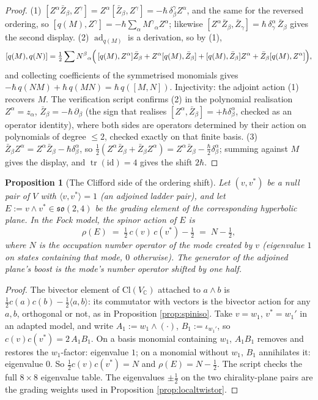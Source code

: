 \documentclass[11pt]{article}
\newtheorem{proposition}[theorem]{Proposition}
\theoremstyle{definition}
\newcommand{\Cl}{\mathrm{Cl}}
\newcommand{\C}{\mathbb{C}}
\newcommand{\ip}[2]{\langle #1, #2\rangle}
\begin{document}
\begin{proof}
(1) $[Z^\alpha\bar Z_\beta, Z^\gamma] = Z^\alpha[\bar Z_\beta, Z^\gamma] = -\hbar\,\delta^\gamma_\beta Z^\alpha$, and the same for the reversed ordering, so $[q(M), Z^\gamma] = -\hbar\sum_\alpha M^\gamma{}_\alpha Z^\alpha$; likewise $[Z^\alpha \bar Z_\beta, \bar Z_\gamma] = \hbar\,\delta^\alpha_\gamma\,\bar Z_\beta$ gives the second display.
(2) $\operatorname{ad}_{q(M)}$ is a derivation, so by (1),
\[
[q(M), q(N)] = \tfrac12\sum N^\beta{}_\alpha\Bigl(\,[q(M),Z^\alpha]\bar Z_\beta + Z^\alpha[q(M),\bar Z_\beta] + [q(M),\bar Z_\beta]Z^\alpha + \bar Z_\beta[q(M),Z^\alpha]\Bigr),
\]
and collecting coefficients of the symmetrised monomials gives $-\hbar\,q(NM) + \hbar\,q(MN) = \hbar\,q([M,N])$. Injectivity: the adjoint action (1) recovers $M$. The verification script confirms (2) in the polynomial realisation $Z^\alpha = z_\alpha$, $\bar Z_\beta = -\hbar\,\partial_\beta$ (the sign that realises $[Z^\alpha, \bar Z_\beta] = +\hbar\delta^\alpha_\beta$, checked as an operator identity), where both sides are operators determined by their action on polynomials of degree $\le 2$, checked exactly on that finite basis.
(3) $\bar Z_\beta Z^\alpha = Z^\alpha \bar Z_\beta - \hbar\delta^\alpha_\beta$, so $\tfrac12(Z^\alpha\bar Z_\beta + \bar Z_\beta Z^\alpha) = Z^\alpha\bar Z_\beta - \tfrac{\hbar}{2}\delta^\alpha_\beta$; summing against $M$ gives the display, and $\operatorname{tr}(\mathrm{id}) = 4$ gives the shift $2\hbar$.
\end{proof}

\begin{proposition}[The Clifford side of the ordering shift]\label{prop:rent}
Let $(v, v^*)$ be a null pair of $V$ with $\ip{v}{v^*} = 1$ (an adjoined ladder pair), and let $E := v\wedge v^* \in \mathfrak{so}(2,4)$ be the grading element of the corresponding hyperbolic plane. In the Fock model, the spinor action of $E$ is
\[
\rho(E) \;=\; \tfrac12\,c(v)\,c(v^*) - \tfrac12 \;=\; N - \tfrac12 ,
\]
where $N$ is the occupation number operator of the mode created by $v$ (eigenvalue $1$ on states containing that mode, $0$ otherwise). The generator of the adjoined plane's boost is the mode's number operator shifted by one half.
\end{proposition}

\begin{proof}
The bivector element of $\Cl(V_\C)$ attached to $a\wedge b$ is $\tfrac12 c(a)c(b) - \tfrac12\ip{a}{b}$: its commutator with vectors is the bivector action for any $a, b$, orthogonal or not, as in Proposition \ref{prop:spiniso}. Take $v = w_1$, $v^* = w_1'$ in an adapted model, and write $A_1 := w_1\wedge(\cdot)$, $B_1 := \iota_{w_1'}$, so $c(v)c(v^*) = 2\,A_1 B_1$. On a basis monomial containing $w_1$, $A_1B_1$ removes and restores the $w_1$-factor: eigenvalue $1$; on a monomial without $w_1$, $B_1$ annihilates it: eigenvalue $0$. So $\tfrac12 c(v)c(v^*) = N$ and $\rho(E) = N - \tfrac12$. The script checks the full $8\times 8$ eigenvalue table. The eigenvalues $\pm\tfrac12$ on the two chirality-plane pairs are the grading weights used in Proposition \ref{prop:localtwistor}.
\end{proof}
\end{document}
